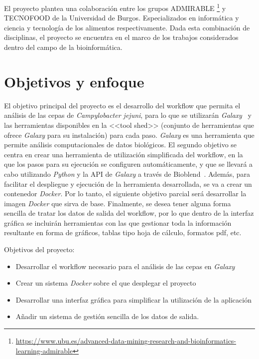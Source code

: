 El proyecto plantea una colaboración entre los grupos ADMIRABLE \footnote{\url{https://www.ubu.es/advanced-data-mining-research-and-bioinformatics-learning-admirable}} y TECNOFOOD de la Universidad de Burgos. Especializados en informática y ciencia y tecnología de los alimentos respectivamente. Dada esta combinación de disciplinas, el proyecto se encuentra en el marco de los trabajos considerados dentro del campo de la bioinformática.


\section{Objetivos y enfoque}
El objetivo principal del proyecto es el desarrollo del workflow que permita el análisis de las cepas de \textit{Campylobacter jejuni}, para lo que se utilizarán \textit{Galaxy}~\cite{afgan2018galaxy} y las herramientas disponibles en la <<tool shed>> (conjunto de herramientas que ofrece \textit{Galaxy} para su instalación) para cada paso. \textit{Galaxy} es una herramienta que permite análisis computacionales de datos biológicos. 
El segundo objetivo se centra en crear una herramienta de utilización simplificada del workflow, en la que los pasos para su ejecución se configuren automáticamente, y que se llevará a cabo utilizando \textit{Python} y la API de \textit{Galaxy} a través de Bioblend~\cite{Sloggett2013}. 
Además, para facilitar el despliegue y ejecución de la herramienta desarrollada, se va a crear un contenedor \textit{Docker}. Por lo tanto, el siguiente objetivo parcial será desarrollar la imagen \textit{Docker} que sirva de base.
Finalmente, se desea tener alguna forma sencilla de tratar los datos de salida del workflow, por lo que dentro de la interfaz gráfica se incluirán herramientas con las que gestionar toda la información resultante en forma de gráficos, tablas tipo hoja de cálculo, formatos pdf, etc.

Objetivos del proyecto:
\begin{itemize}
\item Desarrollar el workflow necesario para el análisis de las cepas en \textit{Galaxy}
\item Crear un sistema \textit{Docker} sobre el que desplegar el proyecto
\item Desarrollar una interfaz gráfica para simplificar la utilización de la aplicación
\item Añadir un sistema de gestión sencilla de los datos de salida.
\end{itemize}


